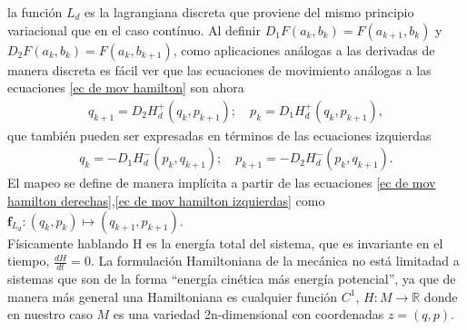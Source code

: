 la función $L_{d}$ es la lagrangiana discreta que proviene del mismo principio variacional que en el caso contínuo. Al definir $D_{1}F(a_{k},b_{k})=F(a_{k+1},b_{k})$ y  $D_{2}F(a_{k},b_{k})=F(a_{k},b_{k+1})$, como aplicaciones análogas a las derivadas de manera discreta  es fácil ver que las ecuaciones de movimiento análogas a las ecuaciones \ref{ec de mov hamilton} son ahora
\begin{eqnarray}
q_{k+1}=D_{2}H_{d}^{+}(q_{k},p_{k+1}); \quad p_{k}=D_{1}H_{d}^{+}(q_{k},p_{k+1}),
\label{ec de mov hamilton derechas}
\end{eqnarray}
que también pueden ser expresadas en términos de las ecuaciones izquierdas 
\begin{eqnarray}
q_{k}=-D_{1}H_{d}^{-}(p_{k},q_{k+1}); \quad p_{k+1}=-D_{2}H_{d}^{-}(p_{k},q_{k+1}).
\label{ec de mov hamilton izquierdas}
\end{eqnarray}
El mapeo se define de manera implícita a partir de las ecuaciones \ref{ec de mov hamilton derechas},\ref{ec de mov hamilton izquierdas} como $\mathbf{f}_{L_{d}}:(q_{k},p_{k})\mapsto(q_{k+1},p_{k+1})$.\\

Físicamente hablando H es la energía total del sistema, que es invariante en el tiempo, $\frac{dH}{dt}=0$. La formulación Hamiltoniana de la mecánica no está limitadad a sistemas que son de la forma  ``energía cinética más energía potencial'', ya que de manera más general una Hamiltoniana es cualquier función $C^{1}$, $H:M\rightarrow \mathbb{R}$ donde en nuestro caso $M$ es una variedad 2n-dimensional con coordenadas  $z=(q,p)$. 




